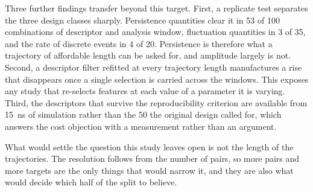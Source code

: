 Three further findings transfer beyond this target. First, a replicate test separates
the three design classes sharply. Persistence quantities clear it in 53 of 100
combinations of descriptor and analysis window, fluctuation quantities in 3 of 35, and
the rate of discrete events in 4 of 20. Persistence is therefore what a trajectory of
affordable length can be asked for, and amplitude largely is not. Second, a descriptor
filter refitted at every trajectory length manufactures a rise that disappears once a
single selection is carried across the windows. This exposes any study that re-selects
features at each value of a parameter it is varying. Third, the descriptors that
survive the reproducibility criterion are available from \SI{15}{\nano\second} of
simulation rather than the 50 the original design called for, which answers the cost
objection with a measurement rather than an argument.

What would settle the question this study leaves open is not the length of the
trajectories. The resolution follows from the number of pairs, so more pairs and more
targets are the only things that would narrow it, and they are also what would decide
which half of the split to believe.
